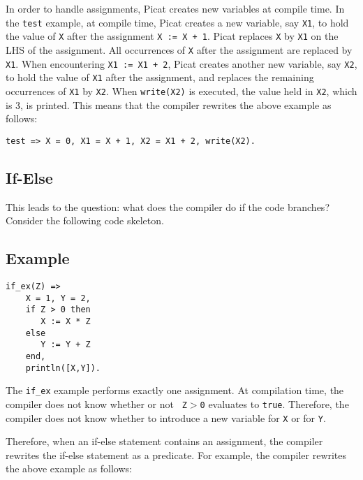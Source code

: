 In order to handle assignments, Picat creates new variables at compile time.  In the \texttt{test} example, at compile time, Picat creates a new variable, say \texttt{X1}, to hold the value of \texttt{X} after the assignment \verb-X := X + 1-. Picat replaces \texttt{X} by \texttt{X1} on the LHS of the assignment.  All occurrences of \texttt{X} after the assignment are replaced by \texttt{X1}.  When encountering \verb-X1 := X1 + 2-, Picat creates another new variable, say \texttt{X2}, to hold the value of \texttt{X1} after the assignment, and replaces the remaining occurrences of \texttt{X1} by \texttt{X2}. When \texttt{write(X2)} is executed, the value held in \texttt{X2}, which is 3, is printed.  This means that the compiler rewrites the above example as follows:
\begin{verbatim}
test => X = 0, X1 = X + 1, X2 = X1 + 2, write(X2).
\end{verbatim}

\subsection{If-Else}
This leads to the question: what does the compiler do if the code branches?  Consider the following code skeleton.
\subsection*{Example}
\begin{verbatim}
if_ex(Z) =>
    X = 1, Y = 2,
    if Z > 0 then
       X := X * Z    
    else
       Y := Y + Z
    end,
    println([X,Y]).
\end{verbatim}

The \texttt{if\_ex} example performs exactly one assignment.  At compilation time, the compiler does not know whether or not \texttt{ Z$>$0} evaluates to \texttt{true}.  Therefore, the compiler does not know whether to introduce a new variable for \texttt{X} or for \texttt{Y}.

Therefore, when an if-else statement contains an assignment, the compiler rewrites the if-else statement as a predicate.  For example, the compiler rewrites the above example as follows:

